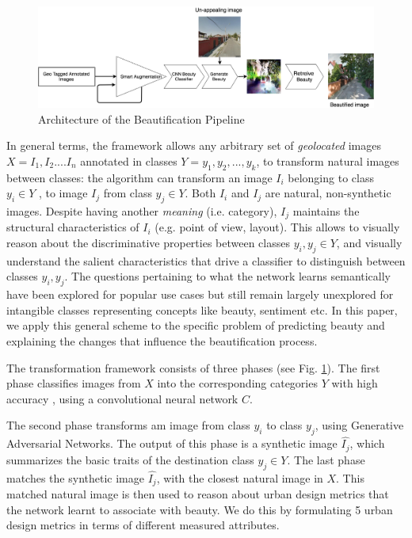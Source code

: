  \begin{figure}[ht]
	\centering
	\includegraphics[width=2\columnwidth]{Plot/UrbanEmotionsPipeline.png}
	\caption{Architecture of the Beautification Pipeline}
	\label{fig:pipeline}
\end{figure}

In general terms, the framework allows any arbitrary set of \emph{geolocated} images $ X = { I_1, I_2 ... . I_n  }$ annotated in classes $Y = {y_1 , y_2 , ... ,y_k}$, to transform natural images between classes: the algorithm can transform an  image $I_i$ belonging to class $y_i \in Y$ , to image $I_j$ from class $y_j \in Y$. Both $I_i$ and $I_j$ are natural, non-synthetic images. Despite having another \emph{meaning} (i.e. category), $I_j$ maintains the structural characteristics of $I_i$ (e.g. point of view, layout).  This allows  to visually reason about the discriminative properties between classes $y_i , y_j \in Y$, and visually understand the salient characteristics that drive a classifier to distinguish between  classes $y_i,y_j$. The questions pertaining to what the network learns semantically have been explored for popular use cases \cite{mao2014explain,karpathy2015deep}  but still remain largely unexplored for intangible classes representing concepts like beauty, sentiment etc.  In this paper, we apply this general scheme to the specific problem of predicting beauty and explaining the changes that influence the beautification process.
\par 
The transformation framework consists of three phases (see Fig. \ref{fig:pipeline}). The first phase
classifies images from $X$ into the corresponding categories $Y$ with high accuracy , using a convolutional neural network $C$.

The second phase transforms am image from class $y_i$ to class $y_j$, using Generative Adversarial Networks\cite{radford2015unsupervised}. The output of this phase is a synthetic image $\hat{I_j}$, which summarizes the basic traits of the destination class $y_j \in Y$. The last phase matches the synthetic image $\hat{I_j}$,  with the closest natural image in $X$. This matched natural image is then used to reason about urban design metrics that the network learnt to associate with beauty. We do this by formulating 5 urban design metrics in terms of different measured attributes.

